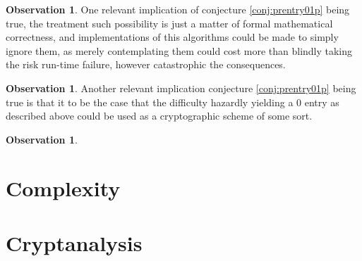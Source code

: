 \documentclass[a4paper,10pt]{article}
\theoremstyle{plain}
\theoremstyle{definition}
\newtheorem{obs}[thm]{Observation} %
\theoremstyle{named}
\begin{document}
\begin{obs}
One relevant implication of conjecture \ref{conj:prentry01p} being true, the treatment such possibility is just a matter of formal mathematical correctness, and implementations of this algorithms could be made to simply ignore them, as merely contemplating them could cost more than blindly taking the risk run-time failure, however catastrophic the consequences.
\end{obs}

\begin{obs}
Another relevant implication conjecture \ref{conj:prentry01p} being true is that it to be the case that the difficulty hazardly yielding a $0$ entry as described above could be used as a cryptographic scheme of some sort.
\end{obs}


\begin{obs}
 
\end{obs}


\section{Complexity}

\section{Cryptanalysis}
\end{document}
